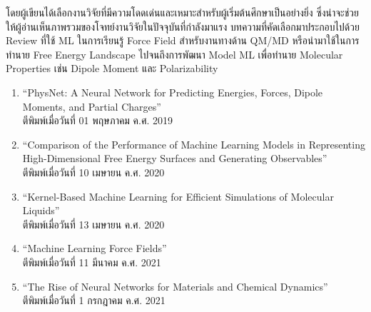 โดยผู้เขียนได้เลือกงานวิจัยที่มีความโดดเด่นและเหมาะสำหรับผู้เริ่มต้นศึกษาเป็นอย่างยิ่ง ซึ่งน่าจะช่วยให้ผู้อ่านเห็นภาพรวมของโจทย์งานวิจัยในปัจจุบันที่กำลังมาแรง
บทความที่คัดเลือกมาประกอบไปด้วย Review ที่ใช้ ML ในการเรียนรู้ Force Field สำหรับงานทางด้าน QM/MD หรือนำมาใช้ในการทำนาย Free Energy Landscape 
ไปจนถึงการพัฒนา Model ML เพื่อทำนาย Molecular Properties เช่น Dipole Moment และ Polarizability 

\begin{enumerate}
    \item \enquote{PhysNet: A Neural Network for Predicting Energies, Forces, Dipole Moments, and Partial Charges}\cite{unke2019}\\
    ตีพิมพ์เมื่อวันที่ 01 พฤษภาคม ค.ศ. 2019
    
    \item \enquote{Comparison of the Performance of Machine Learning Models in Representing High-Dimensional Free Energy Surfaces and Generating Observables}\cite{cendagorta2020}\\
    ตีพิมพ์เมื่อวันที่ 10 เมษายน ค.ศ. 2020
    
    \item \enquote{Kernel-Based Machine Learning for Efficient Simulations of Molecular Liquids}\cite{scherer2020}\\
    ตีพิมพ์เมื่อวันที่ 13 เมษายน ค.ศ. 2020

    \item \enquote{Machine Learning Force Fields}\cite{unke2021}\\
    ตีพิมพ์เมื่อวันที่ 11 มีนาคม ค.ศ. 2021\\

    \item \enquote{The Rise of Neural Networks for Materials and Chemical Dynamics}\cite{kulichenko2021}\\
    ตีพิมพ์เมื่อวันที่ 1 กรกฎาคม ค.ศ. 2021\\

\end{enumerate}
